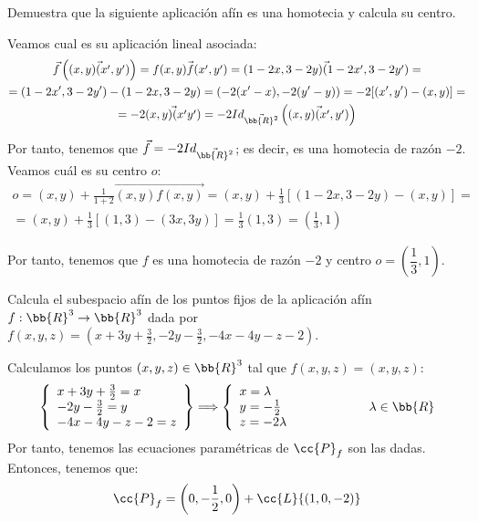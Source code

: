 \begin{ejercicio}
    Demuestra que la siguiente aplicación afín es una homotecia y calcula su centro.

    Veamos cual es su aplicación lineal asociada:
    \begin{multline*}
        \vec{f}\left(\vec{(x,y)(x',y')}\right)
        = \vec{f(x,y)f(x',y')}
        = \vec{(1-2x, 3-2y)(1-2x', 3-2y')}
        =\\= (1-2x', 3-2y')-(1-2x, 3-2y)
        = (-2(x'-x), -2(y'-y))
        = -2[(x',y')-(x,y)]
        =\\= -2\vec{(x,y)(x'y')} = -2Id_{\vec{\bb{R}^2}}\left(\vec{(x,y)(x',y')}\right)
    \end{multline*}

    Por tanto, tenemos que $\vec{f}=-2Id_{\vec{\bb{R}^2}}$; es decir, es una homotecia de razón $-2$. Veamos cuál es su centro $o$:
    \begin{multline*}
        o = (x,y) +\frac{1}{1+2} \vec{(x,y)f(x,y)}
        = (x,y) + \frac{1}{3}[(1-2x,3-2y) - (x,y)]
        =\\= (x,y) + \frac{1}{3}[(1,3)-(3x,3y)] = \frac{1}{3}(1,3)
        = \left(\frac{1}{3},1\right)
    \end{multline*}

    Por tanto, tenemos que $f$ es una homotecia de razón $-2$ y centro $o=\left(\dfrac{1}{3},1\right)$.
\end{ejercicio}

\begin{ejercicio}
    Calcula el subespacio afín de los puntos fijos de la aplicación afín $f : \bb{R}^3\to \bb{R}^3$ dada por $f (x, y, z) =\left(x + 3y + \frac{3}{2}, -2y - \frac{3}{2}, -4x - 4y - z - 2\right)$.

    Calculamos los puntos $(x,y,z)\in \bb{R}^3$ tal que $f(x,y,z)=(x,y,z)$:
    \begin{equation*}
        \left\{
        \begin{array}{l}
            x + 3y+\frac{3}{2} = x\\
            -2y-\frac{3}{2} = y\\
            -4x-4y-z-2=z
        \end{array}
        \right\}
        \Longrightarrow
        \left\{
        \begin{array}{l}
            x=\lambda\\
            y=-\frac{1}{2}\\
            z = -2\lambda
        \end{array} \right.
        \hspace{2cm}\lambda\in\bb{R}
    \end{equation*}
    Por tanto, tenemos las ecuaciones paramétricas de $\cc{P}_f$ son las dadas. Entonces, tenemos que:
    \begin{equation*}
        \cc{P}_f = \left(0,-\frac{1}{2}, 0\right) + \cc{L}\{(1,0,-2)\}
    \end{equation*}
    
\end{ejercicio}

